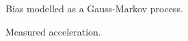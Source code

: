 \documentclass{article}
\begin{document}
\begin{figure}[!ht]
    \centering
    \caption{Bias modelled as a Gauss-Markov process.}
    \label{fig:disc_bias}
\end{figure}

\begin{figure}[!ht]
    \centering
    \caption{Measured acceleration.}
    \label{fig:accel_task3}
\end{figure}
\end{document}
